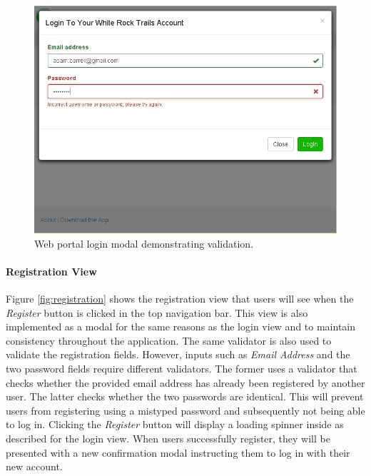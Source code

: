\documentclass[11pt,a4paper]{report}
\begin{document}
\begin{figure}[H]

\centering

\includegraphics[width=0.7\linewidth]{./img/webportal/login}

\caption{Web portal login modal demonstrating validation.}

\label{fig:login}

\end{figure}



\paragraph{Registration View}\mbox{}
Figure \ref{fig:registration} shows the registration view that users will see when the \emph{Register} button is clicked in the top navigation bar. This view is also implemented as a modal for the same reasons as the login view and to maintain consistency throughout the application. The same validator is also used to validate the registration fields. However, inputs such as \emph{Email Address} and the two password fields require different validators. The former uses a validator that checks whether the provided email address has already been registered by another user. The latter checks whether the two passwords are identical. This will prevent users from registering using a mistyped password and subsequently not being able to log in. Clicking the \emph{Register} button will display a loading spinner inside as described for the login view. When users successfully register, they will be presented with a new confirmation modal instructing them to log in with their new account\cite{milestone2}.
\end{document}
